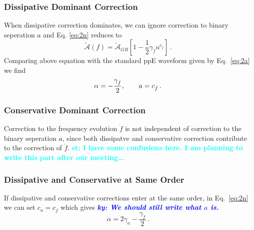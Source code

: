 \documentclass[11pt]{article}
\newcommand{\ky}[1]{\textcolor{blue}{\it{\textbf{ky: #1}}} }
\newcommand{\st}[1]{\textcolor{cyan}{\textbf{st: #1}} }
\begin{document}
\subsubsection*{Dissipative Dominant Correction}
\hspace{15.5pt}When dissipative correction dominates, we can ignore correction to binary seperation $a$ and Eq. \eqref{eq:2n} reduces to
\begin{equation}
\tilde{\mathcal{A}}(f)=\tilde{\mathcal{A}}_{GR} \left[1-\frac{1}{2}\gamma_{\dot{f}}u^{c_{\dot{f}}}\right]\,.
\end{equation}
Comparing above equation with the standard ppE waveform given by Eq.~\eqref{eq:2a} we find
\begin{equation}
\alpha=-\frac{\gamma_{\dot{f}}}{2},\hspace*{20pt}a=c_{\dot{f}}\,.
\end{equation}
\subsubsection*{Conservative Dominant Correction}
\hspace{15.5pt}Correction to the frequency evolution $\dot{f}$ is not independent of correction to the binary seperation $a$, since both dissipatve and conservative correction contribute to the correction of $\dot{f}$. \st{I have some confusions here. I am planning to write this part after our meeting...}
\subsubsection*{Dissipative and Conservative at Same Order}
\hspace{15.5pt}If dissipative and conservative corrections enter at the same order, in Eq.~\eqref{eq:2n} we can set $c_a=c_{\dot{f}}$ which gives \ky{We should still write what $a$ is.}
\begin{equation}
\alpha=2 \text{$\gamma_a $}-\frac{\text{$\gamma_{\dot{f}} $}}{2}\,.
\end{equation}
\end{document}
